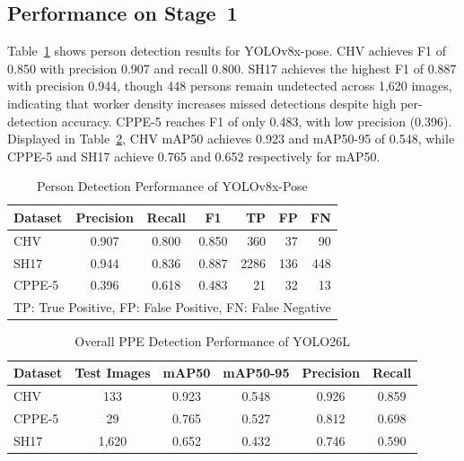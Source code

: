 \documentclass[conference]{IEEEtran}
\begin{document}
\subsection{Performance on Stage~1}
Table~\ref{tab:l1a} shows person detection results for YOLOv8x-pose. CHV achieves F1 of 0.850 with precision 0.907 and recall 0.800. SH17 achieves the highest F1 of 0.887 with precision 0.944, though 448 persons remain undetected across 1,620 images, indicating that worker density increases missed detections despite high per-detection accuracy. CPPE-5 reaches F1 of only 0.483, with low precision (0.396). Displayed in Table~\ref{tab:l1b}, CHV mAP50 achieves 0.923 and mAP50-95 of 0.548, while CPPE-5 and SH17 achieve 0.765 and 0.652 respectively for mAP50.

\begin{table}[!htbp]
    \centering
    \caption{Person Detection Performance of YOLOv8x-Pose}
    \label{tab:l1a}
    \begin{tabular}{lcccrrr}
        \hline
        \textbf{Dataset}&
        \textbf{Precision} & \textbf{Recall} & \textbf{F1} &
        \textbf{TP} & \textbf{FP} & \textbf{FN} \\
        \hline
        CHV    & 0.907 & 0.800 & 0.850 & 360 & 37  & 90  \\
        SH17   & 0.944 & 0.836 & 0.887 & 2286 & 136 & 448 \\
        CPPE-5 & 0.396 & 0.618 & 0.483 & 21  & 32  & 13  \\
        \hline
        \multicolumn{7}{l}{\footnotesize TP: True Positive, FP: False Positive, FN: False Negative}
    \end{tabular}
\end{table}

\begin{table}[!htbp]
    \centering
    \caption{Overall PPE Detection Performance of YOLO26L}
    \label{tab:l1b}
    \begin{tabular}{lccccc}
        \hline
        \textbf{Dataset} &
        \textbf{Test Images} &
        \textbf{mAP50} & \textbf{mAP50-95} &
        \textbf{Precision} & \textbf{Recall} \\
        \hline
        CHV    & 133   & 0.923 & 0.548 & 0.926 & 0.859 \\
        CPPE-5 & 29    & 0.765 & 0.527 & 0.812 & 0.698 \\
        SH17   & 1,620 & 0.652 & 0.432 & 0.746 & 0.590 \\
        \hline
    \end{tabular}
\end{table}
\end{document}
